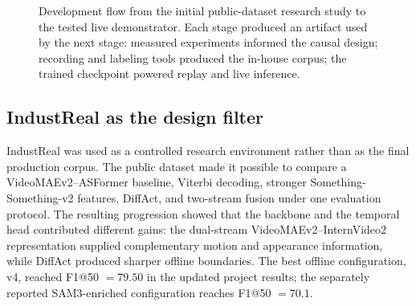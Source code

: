 \documentclass[11pt]{article}
\begin{document}
\begin{figure}[H]
\centering
\setlength{\fboxsep}{7pt}
\caption{Development flow from the initial public-dataset research study to the tested live demonstrator. Each
stage produced an artifact used by the next stage: measured experiments informed the causal design; recording and
labeling tools produced the in-house corpus; the trained checkpoint powered replay and live inference.}
\label{fig:development_flow}
\end{figure}

\subsection{IndustReal as the design filter}
\label{sec:industreal_filter}

IndustReal was used as a controlled research environment rather than as the final production corpus. The public
dataset made it possible to compare a VideoMAEv2--ASFormer baseline, Viterbi decoding, stronger
Something-Something-v2 features, DiffAct, and two-stream fusion under one evaluation protocol. The resulting
progression showed that the backbone and the temporal head contributed different gains: the dual-stream
VideoMAEv2--InternVideo2 representation supplied complementary motion and appearance information, while DiffAct
produced sharper offline boundaries. The best offline configuration, v4, reached F1@50 $=79.50$ in the updated
project results; the separately reported SAM3-enriched configuration reaches F1@50 $=70.1$.
\end{document}
